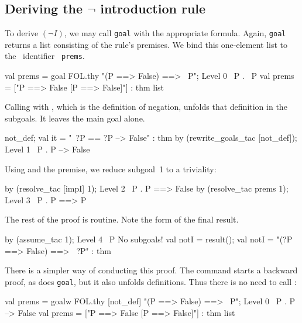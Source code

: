 \subsection{Deriving the $\neg$ introduction rule}
To derive $(\neg I)$, we may call {\tt goal} with the appropriate
formula.  Again, {\tt goal} returns a list consisting of the rule's
premises.  We bind this one-element list to the \ML\ identifier {\tt
  prems}.
\begin{ttbox}
val prems = goal FOL.thy "(P ==> False) ==> ~P";
{\out Level 0}
{\out ~P}
{. ~P}
{\out val prems = ["P ==> False  [P ==> False]"] : thm list}
\end{ttbox}
Calling  with , which is the
definition of negation, unfolds that definition in the subgoals.  It leaves
the main goal alone.
\begin{ttbox}
not_def;
{\out val it = "~?P == ?P --> False" : thm}
by (rewrite_goals_tac [not_def]);
{\out Level 1}
{\out ~P}
{. P --> False}
\end{ttbox}
Using  and the premise, we reduce subgoal~1 to a triviality:
\begin{ttbox}
by (resolve_tac [impI] 1);
{\out Level 2}
{\out ~P}
{. P ==> False}
\ttbreak
by (resolve_tac prems 1);
{\out Level 3}
{\out ~P}
{. P ==> P}
\end{ttbox}
The rest of the proof is routine.  Note the form of the final result.
\begin{ttbox}
by (assume_tac 1);
{\out Level 4}
{\out ~P}
{\out No subgoals!}
\ttbreak
val notI = result();
{\out val notI = "(?P ==> False) ==> ~?P" : thm}
\end{ttbox}

There is a simpler way of conducting this proof.  The 
command starts a backward proof, as does {\tt goal}, but it also
unfolds definitions.  Thus there is no need to call
:
\begin{ttbox}
val prems = goalw FOL.thy [not_def]
    "(P ==> False) ==> ~P";
{\out Level 0}
{\out ~P}
{. P --> False}
{\out val prems = ["P ==> False  [P ==> False]"] : thm list}
\end{ttbox}


